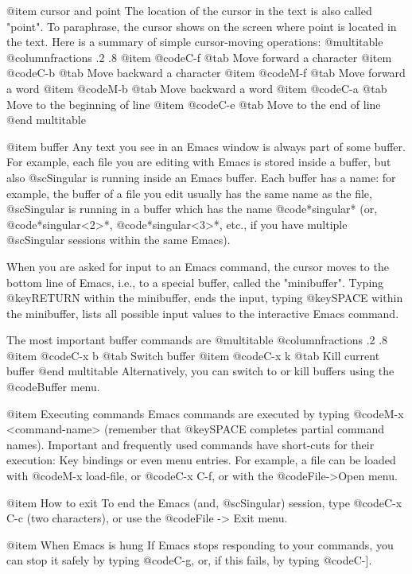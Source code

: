 @item cursor and point
The location of the cursor in the text is also called "point".  To
paraphrase, the cursor shows on the screen where point is located in
the text. Here is a summary of simple cursor-moving operations:
@multitable @columnfractions .2 .8
@item @code{C-f} @tab   Move forward a character
@item @code{C-b} @tab   Move backward a character
@item @code{M-f} @tab   Move forward a word
@item @code{M-b} @tab   Move backward a word
@item @code{C-a} @tab   Move to the beginning of line
@item @code{C-e} @tab   Move to the end of line
@end multitable

@item buffer
Any text you see in an Emacs window is always part of some buffer. For
example, each file you are editing with Emacs is stored inside a buffer,
but also @sc{Singular} is running inside an Emacs buffer. Each buffer
has a name: for example, the buffer of a file you edit usually has the
same name as the file, @sc{Singular} is running in a buffer which has
the name @code{*singular*} (or, @code{*singular<2>*},
@code{*singular<3>*}, etc., if you have multiple @sc{Singular}
sessions within the same Emacs).

When you are asked for input to an Emacs command, the cursor
moves to the bottom line of Emacs, i.e., to a special buffer, called the
"minibuffer". Typing @key{RETURN} within the minibuffer, ends the
input, typing @key{SPACE} within the minibuffer, lists all possible
input values to the interactive Emacs command.

The most important buffer commands are
@multitable @columnfractions .2 .8
@item @code{C-x b} @tab Switch buffer
@item @code{C-x k} @tab Kill current buffer
@end multitable
Alternatively, you can switch to or kill buffers using the @code{Buffer}
menu.

@item Executing commands
Emacs commands are executed by typing @code{M-x <command-name>}
(remember that @key{SPACE} completes partial
command names). Important and frequently used commands have short-cuts
for their execution: Key bindings or even menu entries. For example, a
file can be loaded with @code{M-x load-file}, or @code{C-x C-f}, or with
the @code{File->Open} menu.

@item How to exit
To end the Emacs (and, @sc{Singular}) session,
type @code{C-x C-c} (two characters), or use the @code{File -> Exit}
menu.

@item When Emacs is hung
If Emacs stops responding to your commands, you can stop it safely by
typing @code{C-g}, or, if this fails, by typing @code{C-]}.

